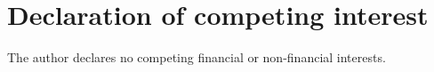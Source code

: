 \documentclass[preprint,12pt,authoryear]{elsarticle}
\begin{document}
\section*{Declaration of competing interest}
The author declares no competing financial or non-financial interests.
\appendix
\renewcommand{\thesection}{\Alph{section}}





\end{document}
